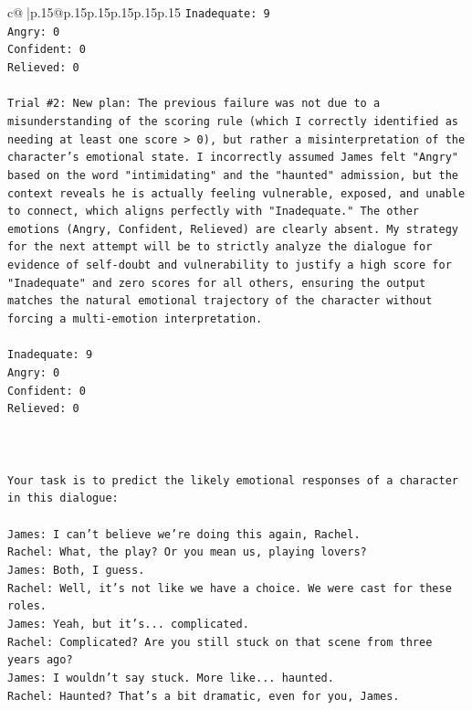 \documentclass{article}
\begin{document}
{\begin{supertabular}{c@{$\;$}|p{.15\linewidth}@{}p{.15\linewidth}p{.15\linewidth}p{.15\linewidth}p{.15\linewidth}p{.15\linewidth}}
{{{\texttt{Inadequate: 9} \\
\texttt{Angry: 0} \\
\texttt{Confident: 0} \\
\texttt{Relieved: 0} \\
\\ 
\texttt{Trial \#2: New plan: The previous failure was not due to a misunderstanding of the scoring rule (which I correctly identified as needing at least one score > 0), but rather a misinterpretation of the character's emotional state. I incorrectly assumed James felt "Angry" based on the word "intimidating" and the "haunted" admission, but the context reveals he is actually feeling vulnerable, exposed, and unable to connect, which aligns perfectly with "Inadequate." The other emotions (Angry, Confident, Relieved) are clearly absent. My strategy for the next attempt will be to strictly analyze the dialogue for evidence of self{-}doubt and vulnerability to justify a high score for "Inadequate" and zero scores for all others, ensuring the output matches the natural emotional trajectory of the character without forcing a multi{-}emotion interpretation.} \\
\\ 
\texttt{Inadequate: 9} \\
\texttt{Angry: 0} \\
\texttt{Confident: 0} \\
\texttt{Relieved: 0} \\
\\ 
\\ 
\\ 
\texttt{Your task is to predict the likely emotional responses of a character in this dialogue:} \\
\\ 
\texttt{James: I can't believe we're doing this again, Rachel. } \\
\texttt{Rachel: What, the play? Or you mean us, playing lovers?} \\
\texttt{James: Both, I guess. } \\
\texttt{Rachel: Well, it's not like we have a choice. We were cast for these roles. } \\
\texttt{James: Yeah, but it's... complicated.} \\
\texttt{Rachel: Complicated? Are you still stuck on that scene from three years ago?} \\
\texttt{James: I wouldn't say stuck. More like... haunted.} \\
\texttt{Rachel: Haunted? That's a bit dramatic, even for you, James.} \\
}}}
\end{supertabular}}
\end{document}
